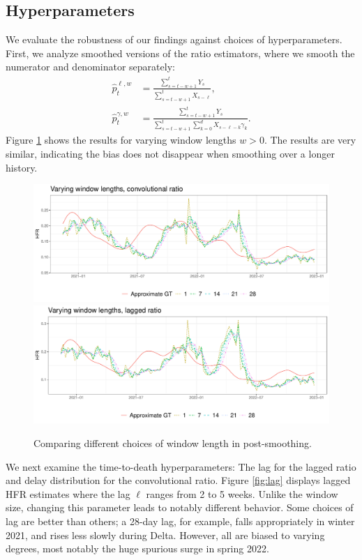 \documentclass{article}
\renewcommand{\hat}{\widehat} %
\begin{document}
\subsection{Hyperparameters}

We evaluate the robustness of our findings against choices of hyperparameters.
First, we analyze smoothed versions of the ratio estimators, where we smooth the 
numerator and denominator separately:
\begin{align*}
\hat{p}_t^{\ell,w} &= \frac{\sum_{s=t-w+1}^t Y_s}
{\sum_{s=t-w+1}^t X_{s-\ell}}, \\ 
\hat{p}_t^{\gamma,w} &= \frac{\sum_{s=t-w+1}^t Y_s}
{\sum_{s=t-w+1}^t \sum_{k=0}^d X_{s-\ell-k}\gamma_k}.
\end{align*} 
Figure \ref{fig:window} shows the results for varying window lengths $w >
0$. The results are very similar, indicating the bias does not disappear when
smoothing over a longer history.  

\begin{figure}[h!]
\centering
\includegraphics[width=.95\linewidth]{Figures/Real/window_size_conv.pdf}
\includegraphics[width=.95\linewidth]{Figures/Real/window_size_lagg.pdf}
\caption{Comparing different choices of window length in post-smoothing.}
\label{fig:window}
\end{figure}

We next examine the time-to-death hyperparameters: The lag for the lagged ratio
and delay distribution for the convolutional ratio. Figure \ref{fig:lag}
displays lagged HFR estimates where the lag $\ell$ ranges from 2 to 5
weeks. Unlike the window size, changing this parameter leads to notably
different behavior. Some choices of lag are better than others; a 28-day lag,
for example, falls appropriately in winter 2021, and rises less slowly during
Delta. However, all are biased to varying degrees, most notably the huge
spurious surge in spring 2022.
\end{document}
